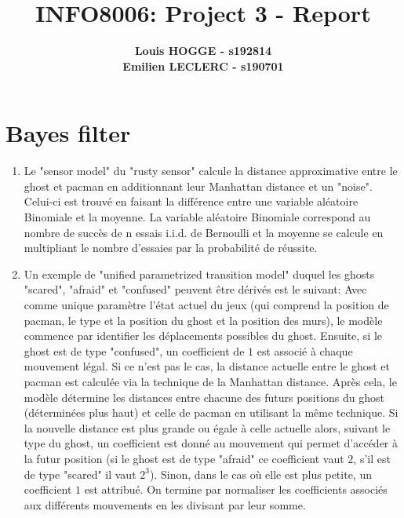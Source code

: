 \documentclass{article}
\begin{document}

\title{\Large{INFO8006: Project 3 - Report}}
\vspace{1cm}
\author{\small{\bf Louis HOGGE - s192814} \\ \small{\bf Emilien LECLERC - s190701}}

\maketitle


\section{Bayes filter}

\begin{enumerate}[label=\alph*.,leftmargin=*]
    \item Le "sensor model" du "rusty sensor" calcule la distance approximative entre le ghost et pacman en additionnant leur Manhattan distance et un "noise". Celui-ci est trouvé en faisant la différence entre une variable aléatoire Binomiale et la moyenne. La variable aléatoire Binomiale correspond au nombre de succès de n essais i.i.d. de Bernoulli et la moyenne se calcule en multipliant le nombre d'essaies par la probabilité de réussite.
    \item Un exemple de "unified parametrized transition model" duquel les ghosts "scared", "afraid" et "confused" peuvent être dérivés est le suivant: Avec comme unique paramètre l'état actuel du jeux (qui comprend la position de pacman, le type et la position du ghost et la position des murs), le modèle commence par identifier les déplacements possibles du ghost. Ensuite, si le ghost est de type "confused", un coefficient de $1$ est associé à chaque mouvement légal. Si ce n'est pas le cas, la distance actuelle entre le ghost et pacman est calculée via la technique de la Manhattan distance. Après cela, le modèle détermine les distances entre chacune des futurs positions du ghost (déterminées plus haut) et celle de pacman en utilisant la même technique. Si la nouvelle distance est plus grande ou égale à celle actuelle alors, suivant le type du ghost, un coefficient est donné au mouvement qui permet d'accéder à la futur position (si le ghost est de type "afraid" ce coefficient vaut $2$, s'il est de type "scared" il vaut $2^{3}$). Sinon, dans le cas où elle est plus petite, un coefficient $1$ est attribué. On termine par normaliser les coefficients associés aux différents mouvements en les divisant par leur somme.
\end{enumerate}
\end{document}
